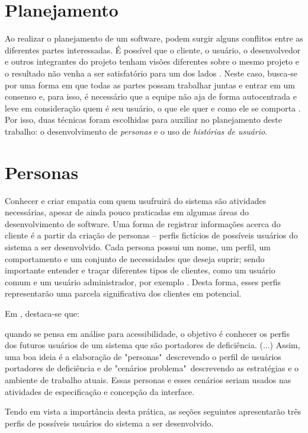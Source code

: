 \section{Planejamento}
Ao realizar o planejamento de um software, podem surgir alguns conflitos entre as diferentes partes interessadas. É possível que o cliente, o usuário, o desenvolvedor e outros integrantes do projeto tenham visões diferentes sobre o mesmo projeto e o resultado não venha a ser satisfatório para um dos lados \cite{COHN2004}. Neste caso, busca-se por uma forma em que todas as partes possam trabalhar juntas e entrar em um consenso e, para isso, é necessário que a equipe não aja de forma autocentrada e leve em consideração quem é seu usuário, o que ele quer e como ele se comporta \cite{AUDY2015}. Por isso, duas técnicas foram escolhidas para auxiliar no planejamento deste trabalho: o desenvolvimento de \textit{personas} e o uso de \textit{histórias de usuário}.


\section{Personas}

Conhecer e criar empatia com quem usufruirá do sistema são atividades necessárias, apesar de ainda pouco praticadas em algumas áreas do desenvolvimento de software. Uma forma de registrar informações acerca do cliente é a partir da criação de personas -- perfis fictícios de possíveis usuários do sistema a ser desenvolvido. Cada persona possui um nome, um perfil, um comportamento e um conjunto de necessidades que deseja suprir; sendo importante entender e traçar diferentes tipos de clientes, como um usuário comum e um usuário administrador, por exemplo \cite{AUDY2015}. Desta forma, esses perfis representarão uma parcela significativa dos clientes em potencial.

Em \cite{ERGO2015}, destaca-se que:
\begin{directcite}
    quando se pensa em análise para acessibilidade, o objetivo é conhecer os perfis dos futuros usuários de um sistema que são portadores de deficiência. (...) Assim, uma boa ideia é a elaboração de "personas"\ descrevendo o perfil de usuários portadores de deficiência e de "cenários problema"\ descrevendo as estratégias e o ambiente de trabalho atuais. 
    Essas personas e esses cenários seriam usados nas atividades de especificação e concepção da interface.
\end{directcite}
Tendo em vista a importância desta prática, as seções seguintes apresentarão três perfis de possíveis usuários do sistema a ser desenvolvido.

